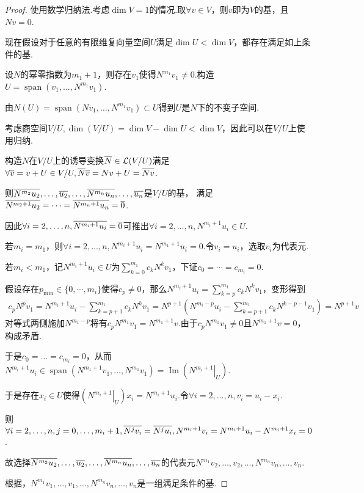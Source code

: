 \begin{proof}
    使用数学归纳法.考虑\(\dim V=1\)的情况.取\(\forall v \in V\)，则\(v\)即为\(V\)的基，且\(Nv=0\).

    现在假设对于任意的有限维复向量空间\(U\)满足\(\dim U<\dim V\)，都存在满足如上条件的基.
    
    设\(N\)的幂零指数为\(m_1+1\)，则存在\(v_1\)使得\(N^{m_1}v_1 \ne 0\).构造\(U=\operatorname{span}(v_1, \dots, N^{m_1}v_1)\).
    
    由\(N(U)=\operatorname{span}(Nv_1, \dots, N^{m_1}v_1) \subset U\)得到\(U\)是\(N\)下的不变子空间.
    
    考虑商空间\(V/U,\dim (V/U)=\dim V-\dim U<\dim V\)，因此可以在\(V/U\)上使用归纳.
    
    构造\(N\)在\(V/U\)上的诱导变换\(\overline{N} \in \mathcal{L}(V/U)\)满足\(\forall \overline{v}=v+U \in V/U, \overline{N}\overline{v}=Nv+U=\overline{Nv}\).
    
    则\(\overline{N^{m_2}u_2}, \dots, \overline{u_2}, \dots, \overline{N^{m_n}u_n}, \dots, \overline{u_n}\)是\(V/U\)的基，
    满足\(\overline{N^{m_2+1}u_2}=\dots=\overline{N^{m_n+1}u_n}=\overline{0}\).
    
    因此\(\forall i=2, \dots, n, \overline{N^{m_i+1}u_i}=\overline{0}\)可推出\(\forall i=2, \dots, n, N^{m_i+1}u_i \in U\).
    
    若\(m_i=m_1\)，则\(\forall i=2, \dots, n, N^{m_i+1}u_i=N^{m_1+1}u_i=0\).令\(v_i=u_i\)，选取\(v_i\)为代表元.
    
    若\(m_i<m_1\)，记\(N^{m_i+1}u_i \in U\)为\(\sum_{k=0}^{m_1}c_kN^kv_1\)，下证\(c_0=\cdots=c_{m_i}=0\).
    
    假设存在\(p_{\min} \in \{0,\cdots,m_i\}\)使得\(c_p \ne 0\)，那么\(N^{m_i+1}u_i=\sum_{k=p}^{m_1}c_kN^kv_1\)，变形得到
    \begin{align*}
        c_pN^pv_1=N^{m_i+1}u_i-\sum_{k=p+1}^{m_1}c_kN^kv_1=N^{p+1}\left(N^{m_i-p}u_i-\sum_{k=p+1}^{m_1}c_kN^{k-p-1}v_1\right)=N^{p+1}v
    \end{align*}
    对等式两侧施加\(N^{m_1-p}\)将有\(c_pN^{m_1}v_1=N^{m_1+1}v\).由于\(c_pN^{m_1}v_1 \ne 0\)且\(N^{m_1+1}v=0\)，构成矛盾.

    于是\(c_0=\dots=c_{m_i}=0\)，从而\(N^{m_i+1}u_i \in \operatorname{span}(N^{m_1+1}v_1, \dots, N^{m_1}v_1)=\operatorname{Im}(\left.N^{m_i+1}\right|_U)\).
    
    于是存在\(x_i \in U\)使得\((\left.N^{m_i+1}\right|_U)x_i=N^{m_i+1}u_i\).令\(\forall i=2, \dots, n, v_i=u_i-x_i\).
    
    则\(\forall i=2, \dots, n, j=0, \dots, m_i+1,\overline{N^jv_i}=\overline{N^ju_i},N^{m_i+1}v_i=N^{m_i+1}u_i-N^{m_i+1}x_i=0\).

    故选择\(\overline{N^{m_2}u_2}, \dots, \overline{u_2}, \dots, \overline{N^{m_n}u_n}, \dots, \overline{u_n}\)的代表元\(N^{m_1}v_2, \dots, v_2, \dots, N^{m_n}v_n, \dots, v_n\).
    
    根据，\(N^{m_1}v_1, \dots, v_1, \dots, N^{m_n}v_n, \dots, v_n\)是一组满足条件的基.
\end{proof}

